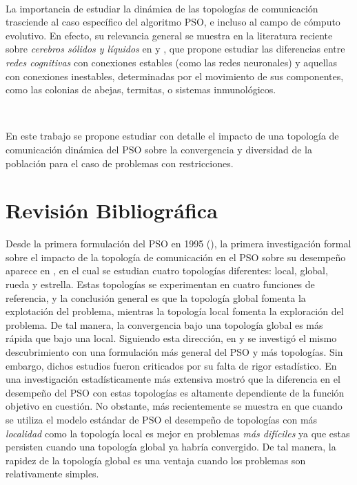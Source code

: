 \documentclass{article}
\begin{document}
\

La importancia de estudiar la dinámica de las topologías de comunicación trasciende al caso específico del algoritmo PSO, e incluso al campo de cómputo evolutivo. En efecto, su relevancia general se muestra en la literatura reciente sobre \textit{cerebros sólidos y líquidos} en \cite{sole19} y \cite{vining19}, que propone estudiar las diferencias entre \textit{redes cognitivas} con conexiones estables (como las redes neuronales) y aquellas con conexiones inestables, determinadas por el movimiento de sus componentes, como las colonias de abejas, termitas, o sistemas inmunológicos.  

\

En este trabajo se propone estudiar con detalle el impacto de una topología de comunicación dinámica del PSO sobre la convergencia y diversidad de la población para el caso de problemas con restricciones.

\newpage
\section*{Revisión Bibliográfica}

Desde la primera formulación del PSO en 1995 (\cite{kennedy95}), la primera investigación formal sobre el impacto de la topología de comunicación en el PSO sobre su desempeño aparece en \cite{kennedy99}, en el cual se estudian cuatro topologías diferentes: local, global, rueda y estrella. Estas topologías se experimentan en cuatro funciones de referencia, y la conclusión general es que la topología global fomenta la explotación del problema, mientras la topología local fomenta la exploración del problema. De tal manera, la convergencia bajo una topología global es más rápida que bajo una local. Siguiendo esta dirección, en \cite{kennedy02} y \cite{mendes04} se investigó el mismo descubrimiento con una formulación más general del PSO y más topologías. Sin embargo, dichos estudios fueron criticados por su falta de rigor estadístico. En \cite{engelbrecht13} una investigación estadísticamente más extensiva mostró que la diferencia en el desempeño del PSO con estas topologías es altamente dependiente de la función objetivo en cuestión. No obstante, más recientemente se muestra en \cite{blackwell18} que cuando se utiliza el modelo estándar de PSO el desempeño de topologías con más \textit{localidad} como la topología local es mejor en problemas \textit{más difíciles} ya que estas persisten cuando una topología global ya habría convergido. De tal manera, la rapidez de la topología global es una ventaja cuando los problemas son relativamente simples. 
\end{document}
